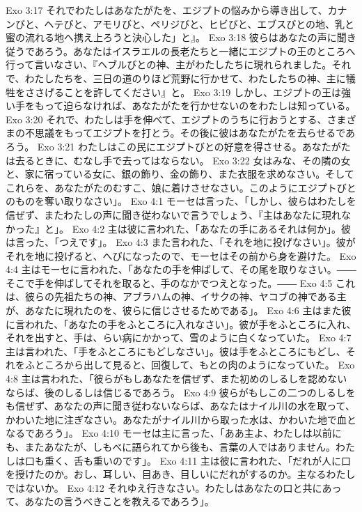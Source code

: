 Exo 3:17  それでわたしはあなたがたを、エジプトの悩みから導き出して、カナンびと、ヘテびと、アモリびと、ペリジびと、ヒビびと、エブスびとの地、乳と蜜の流れる地へ携え上ろうと決心した」と』。
Exo 3:18  彼らはあなたの声に聞き従うであろう。あなたはイスラエルの長老たちと一緒にエジプトの王のところへ行って言いなさい、『ヘブルびとの神、主がわたしたちに現れられました。それで、わたしたちを、三日の道のりほど荒野に行かせて、わたしたちの神、主に犠牲をささげることを許してください』と。
Exo 3:19  しかし、エジプトの王は強い手をもって迫らなければ、あなたがたを行かせないのをわたしは知っている。
Exo 3:20  それで、わたしは手を伸べて、エジプトのうちに行おうとする、さまざまの不思議をもってエジプトを打とう。その後に彼はあなたがたを去らせるであろう。
Exo 3:21  わたしはこの民にエジプトびとの好意を得させる。あなたがたは去るときに、むなし手で去ってはならない。
Exo 3:22  女はみな、その隣の女と、家に宿っている女に、銀の飾り、金の飾り、また衣服を求めなさい。そしてこれらを、あなたがたのむすこ、娘に着けさせなさい。このようにエジプトびとのものを奪い取りなさい」。
Exo 4:1  モーセは言った、「しかし、彼らはわたしを信ぜず、またわたしの声に聞き従わないで言うでしょう、『主はあなたに現れなかった』と」。
Exo 4:2  主は彼に言われた、「あなたの手にあるそれは何か」。彼は言った、「つえです」。
Exo 4:3  また言われた、「それを地に投げなさい」。彼がそれを地に投げると、へびになったので、モーセはその前から身を避けた。
Exo 4:4  主はモーセに言われた、「あなたの手を伸ばして、その尾を取りなさい。――そこで手を伸ばしてそれを取ると、手のなかでつえとなった。――
Exo 4:5  これは、彼らの先祖たちの神、アブラハムの神、イサクの神、ヤコブの神である主が、あなたに現れたのを、彼らに信じさせるためである」。
Exo 4:6  主はまた彼に言われた、「あなたの手をふところに入れなさい」。彼が手をふところに入れ、それを出すと、手は、らい病にかかって、雪のように白くなっていた。
Exo 4:7  主は言われた、「手をふところにもどしなさい」。彼は手をふところにもどし、それをふところから出して見ると、回復して、もとの肉のようになっていた。
Exo 4:8  主は言われた、「彼らがもしあなたを信ぜず、また初めのしるしを認めないならば、後のしるしは信じるであろう。
Exo 4:9  彼らがもしこの二つのしるしをも信ぜず、あなたの声に聞き従わないならば、あなたはナイル川の水を取って、かわいた地に注ぎなさい。あなたがナイル川から取った水は、かわいた地で血となるであろう」。
Exo 4:10  モーセは主に言った、「ああ主よ、わたしは以前にも、またあなたが、しもべに語られてから後も、言葉の人ではありません。わたしは口も重く、舌も重いのです」。
Exo 4:11  主は彼に言われた、「だれが人に口を授けたのか。おし、耳しい、目あき、目しいにだれがするのか。主なるわたしではないか。
Exo 4:12  それゆえ行きなさい。わたしはあなたの口と共にあって、あなたの言うべきことを教えるであろう」。
